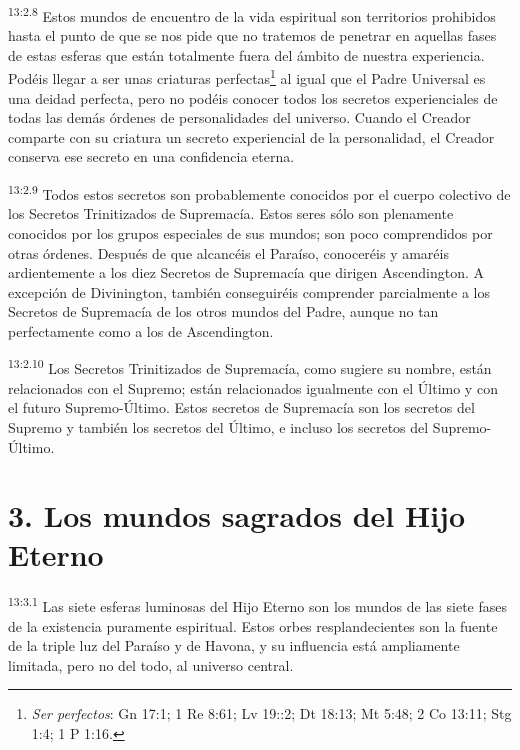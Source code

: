 \par
\textsuperscript{13:2.8} Estos mundos de encuentro de la vida espiritual son territorios prohibidos hasta el punto de que se nos pide que no tratemos de penetrar en aquellas fases de estas esferas que están totalmente fuera del ámbito de nuestra experiencia. Podéis llegar a ser unas criaturas perfectas\footnote{\textit{Ser perfectos}: Gn 17:1; 1 Re 8:61; Lv 19::2; Dt 18:13; Mt 5:48; 2 Co 13:11; Stg 1:4; 1 P 1:16.} al igual que el Padre Universal es una deidad perfecta, pero no podéis conocer todos los secretos experienciales de todas las demás órdenes de personalidades del universo. Cuando el Creador comparte con su criatura un secreto experiencial de la personalidad, el Creador conserva ese secreto en una confidencia eterna.

\par
\textsuperscript{13:2.9} Todos estos secretos son probablemente conocidos por el cuerpo colectivo de los Secretos Trinitizados de Supremacía. Estos seres sólo son plenamente conocidos por los grupos especiales de sus mundos; son poco comprendidos por otras órdenes. Después de que alcancéis el Paraíso, conoceréis y amaréis ardientemente a los diez Secretos de Supremacía que dirigen Ascendington. A excepción de Divinington, también conseguiréis comprender parcialmente a los Secretos de Supremacía de los otros mundos del Padre, aunque no tan perfectamente como a los de Ascendington.

\par
\textsuperscript{13:2.10} Los Secretos Trinitizados de Supremacía, como sugiere su nombre, están relacionados con el Supremo; están relacionados igualmente con el Último y con el futuro Supremo-Último. Estos secretos de Supremacía son los secretos del Supremo y también los secretos del Último, e incluso los secretos del Supremo-Último.

\section*{3. Los mundos sagrados del Hijo Eterno}
\par
\textsuperscript{13:3.1} Las siete esferas luminosas del Hijo Eterno son los mundos de las siete fases de la existencia puramente espiritual. Estos orbes resplandecientes son la fuente de la triple luz del Paraíso y de Havona, y su influencia está ampliamente limitada, pero no del todo, al universo central.

